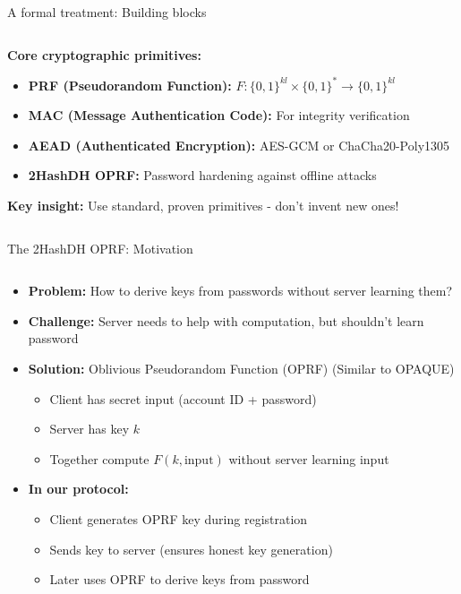 \documentclass[aspectratio=169, lualatex, handout]{beamer}
\begin{document}
\begin{frame}{A formal treatment: Building blocks}
	\begin{columns}[c]
		\begin{column}{1\textwidth}
			\textbf{Core cryptographic primitives:}
			\begin{itemize}
				\item \textbf{PRF (Pseudorandom Function):} $F: \{0,1\}^{kl} \times \{0,1\}^* \to \{0,1\}^{kl}$
				\item \textbf{MAC (Message Authentication Code):} For integrity verification
				\item \textbf{AEAD (Authenticated Encryption):} AES-GCM or ChaCha20-Poly1305
				\item \textbf{2HashDH OPRF:} Password hardening against offline attacks
			\end{itemize}
			\vspace{0.3cm}
			\textbf{Key insight:} Use standard, proven primitives - don't invent new ones!
		\end{column}
	\end{columns}
\end{frame}

\begin{frame}{The 2HashDH OPRF: Motivation}
	\begin{columns}[c]
		\begin{column}{1\textwidth}
			\begin{itemize}
				\item \textbf{Problem:} How to derive keys from passwords without server learning them?
				\item \textbf{Challenge:} Server needs to help with computation, but shouldn't learn password
				\item \textbf{Solution:} Oblivious Pseudorandom Function (OPRF) (Similar to OPAQUE)
				      \begin{itemize}
					      \item Client has secret input (account ID + password)
					      \item Server has key $k$
					      \item Together compute $F(k, \text{input})$ without server learning input
				      \end{itemize}
				\item \textbf{In our protocol:}
				      \begin{itemize}
					      \item Client generates OPRF key during registration
					      \item Sends key to server (ensures honest key generation)
					      \item Later uses OPRF to derive keys from password
				      \end{itemize}
			\end{itemize}
		\end{column}
	\end{columns}
\end{frame}
\end{document}
